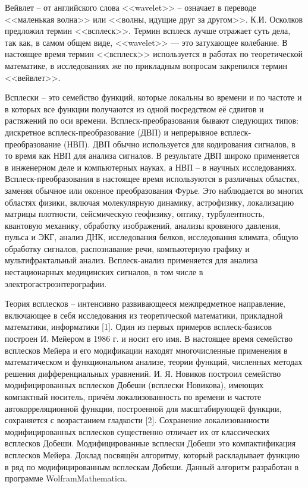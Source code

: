 


\vzmscaption

Вейвлет -- от английского слова <<wavelet>> -- означает в переводе <<маленькая волна>>  или <<волны, идущие друг за другом>>.  К.И. Осколков предложил термин <<всплеск>>. Термин всплеск лучше отражает суть дела, так как, в самом общем виде, <<wavelet>> --- это затухающее колебание.
В настоящее время термин <<всплеск>> используется в работах по теоретической математике,  в исследованиях же по прикладным вопросам закрепился термин <<вейвлет>>.

Всплески -- это семейство функций, которые локальны во времени и по частоте и в которых все функции получаются из одной посредством её сдвигов и растяжений по оси времени.
Всплеск-преобразования бывают следующих типов: дискретное всплеск-преобразование (ДВП) и непрерывное всплеск-преобразование (НВП).
ДВП обычно используется для кодирования сигналов, в то время как НВП для анализа сигналов. В результате ДВП широко применяется в инженерном деле и компьютерных науках, а НВП -- в научных исследованиях. Всплеск-преобразования в настоящее время используются в различных областях, заменяя обычное или оконное преобразования Фурье. Это наблюдается во многих областях физики, включая молекулярную динамику, астрофизику, локализацию матрицы плотности, сейсмическую геофизику, оптику, турбулентность, квантовую механику, обработку изображений, анализы кровяного давления, пульса и ЭКГ, анализ ДНК, исследования белков, исследования климата, общую обработку сигналов, распознавание речи, компьютерную графику и мультифрактальный анализ. Всплеск-анализ применяется для анализа нестационарных медицинских сигналов, в том числе в электрогастроэнтерографии.

Теория всплесков -- интенсивно развивающееся межпредметное направление, включающее в себя исследования из теоретической математики, прикладной математики, информатики [1]. Один из первых примеров всплеск-базисов построен И. Мейером в 1986 г. и носит его имя. В настоящее время семейство всплесков Мейера и его модификации находят многочисленные применения в математическом и функциональном анализе, теории функций, численных методах решения дифференциальных уравнений.
 И. Я. Новиков построил семейство модифицированных всплесков Добеши (всплески Новикова), имеющих компактный носитель, причём локализованность по времени и частоте автокорреляционной функции, построенной для масштабирующей функции, сохраняется с возрастанием гладкости [2]. Сохранение локализованности модифицированных всплесков существенно отличает их от классических всплесков Добеши.
Модифицированные всплески Добеши это компактификация всплесков Мейера.
Доклад посвящён алгоритму, который раскладывает функцию в ряд по модифицированным всплескам Добеши. Данный алгоритм разработан в программе WolframMathematica.

